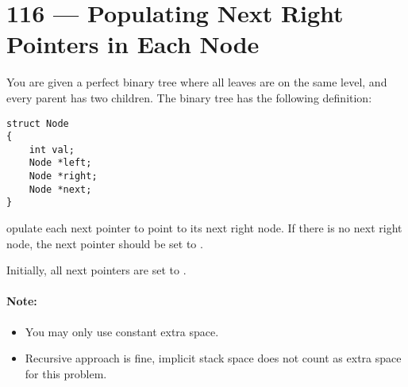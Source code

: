 
\section{116 --- Populating Next Right Pointers in Each Node}
You are given a perfect binary tree where all leaves are on the same level, and every parent has two children. The binary tree has the following definition:

\begin{lstlisting}[style=customc]
struct Node
{
    int val;
    Node *left;
    Node *right;
    Node *next;
}
\end{lstlisting}

opulate each next pointer to point to its next right node. If there is no next right node, the next pointer should be set to .

Initially, all next pointers are set to .
\paragraph{Note:}

\begin{itemize}
\item You may only use constant extra space.
\item Recursive approach is fine, implicit stack space does not count as extra space for this problem.
\end{itemize}

